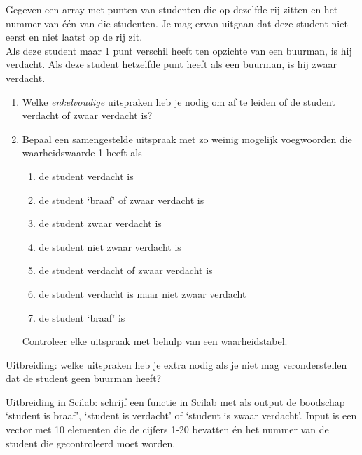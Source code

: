 \begin{oef}
Gegeven een array met punten van studenten die op dezelfde rij zitten en het nummer van één van die studenten. Je mag ervan uitgaan dat deze student niet eerst en niet laatst op de rij zit.\\
Als deze student maar 1 punt verschil heeft ten opzichte van een buurman, is hij verdacht. Als deze student hetzelfde punt heeft als een buurman, is hij zwaar verdacht.
\begin{enumerate}
\item Welke \textit{enkelvoudige} uitspraken heb je nodig om af te leiden of de student verdacht of zwaar verdacht is?
\item Bepaal een samengestelde uitspraak met zo weinig mogelijk voegwoorden die waarheidswaarde 1 heeft als
\begin{enumerate}
\item de student verdacht is
\item de student ‘braaf’ of zwaar verdacht is
\item de student zwaar verdacht is
\item de student niet zwaar verdacht is
\item de student verdacht of zwaar verdacht is
\item de student verdacht is maar niet zwaar verdacht
\item de student `braaf' is
\end{enumerate}
Controleer elke uitspraak met behulp van een waarheidstabel.
\end{enumerate}

\noindent
Uitbreiding: welke uitspraken heb je extra nodig als je niet mag veronderstellen dat de student geen buurman heeft?

\noindent
Uitbreiding in Scilab: schrijf een functie in Scilab met als output de boodschap `student is braaf', `student is verdacht' of `student is zwaar verdacht'. Input is een vector met 10 elementen die de cijfers 1-20 bevatten én het nummer van de student die gecontroleerd moet worden.


\end{oef}
